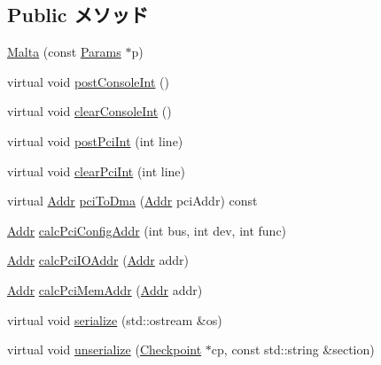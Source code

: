 \subsection*{Public メソッド}
\begin{DoxyCompactItemize}
\item 
\hyperlink{classMalta_a737e6039fde9f614aee1026aa86405fb}{Malta} (const \hyperlink{classMalta_a189ad6fd96fd77d2ea4e32ba0a9e5298}{Params} $\ast$p)
\item 
virtual void \hyperlink{classMalta_a5b278cebc0a62bc2195edf27f059ab1a}{postConsoleInt} ()
\item 
virtual void \hyperlink{classMalta_ad38e46034c079c8e765d3ac7eb99337d}{clearConsoleInt} ()
\item 
virtual void \hyperlink{classMalta_a545d1445357706d7259aa73104f44222}{postPciInt} (int line)
\item 
virtual void \hyperlink{classMalta_a0d98ea2b236bb883fa15d63a59a2ec9e}{clearPciInt} (int line)
\item 
virtual \hyperlink{base_2types_8hh_af1bb03d6a4ee096394a6749f0a169232}{Addr} \hyperlink{classMalta_a87078b3d3a28ae134f6736337e90dac3}{pciToDma} (\hyperlink{base_2types_8hh_af1bb03d6a4ee096394a6749f0a169232}{Addr} pciAddr) const 
\item 
\hyperlink{base_2types_8hh_af1bb03d6a4ee096394a6749f0a169232}{Addr} \hyperlink{classMalta_a5b8797a83289cb5fd895c9a5dc7eae6f}{calcPciConfigAddr} (int bus, int dev, int func)
\item 
\hyperlink{base_2types_8hh_af1bb03d6a4ee096394a6749f0a169232}{Addr} \hyperlink{classMalta_a83afd16479598cfaeb035fd30eeedd8b}{calcPciIOAddr} (\hyperlink{base_2types_8hh_af1bb03d6a4ee096394a6749f0a169232}{Addr} addr)
\item 
\hyperlink{base_2types_8hh_af1bb03d6a4ee096394a6749f0a169232}{Addr} \hyperlink{classMalta_aa2acd9bf04ba56b380e7812ce29971b5}{calcPciMemAddr} (\hyperlink{base_2types_8hh_af1bb03d6a4ee096394a6749f0a169232}{Addr} addr)
\item 
virtual void \hyperlink{classMalta_a53e036786d17361be4c7320d39c99b84}{serialize} (std::ostream \&os)
\item 
virtual void \hyperlink{classMalta_af22e5d6d660b97db37003ac61ac4ee49}{unserialize} (\hyperlink{classCheckpoint}{Checkpoint} $\ast$cp, const std::string \&section)
\end{DoxyCompactItemize}

